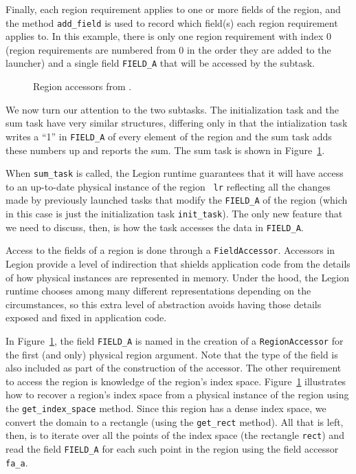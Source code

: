 Finally, each region requirement applies to one or more fields of the region, and the method {\tt add\_field} is
used to record which field(s) each region requirement applies to.
In this example, there is only one region requirement with index 0 (region requirements
are numbered from 0 in the order they are added to the launcher) and a single field {\tt FIELD\_A} that will be
accessed by the subtask.

\begin{figure}
  {\small
  }
\caption{Region accessors from .}
\label{fig:accessors}
\end{figure}
We now turn our attention to the two subtasks.  The initialization task and the sum task have very similar
structures, differing only in that the intialization task writes a ``1'' in {\tt FIELD\_A} of every element of the region and
the sum task adds these numbers up and reports the sum.  The sum task is shown in Figure~\ref{fig:accessors}.

When {\tt sum\_task} is called, the Legion runtime guarantees that it
will have access to an up-to-date physical instance of the region {\tt
  lr} reflecting all the changes made by previously launched tasks
that modify the {\tt FIELD\_A} of the region (which in this case is
just the initialization task {\tt init\_task}).  The only new feature
that we need to discuss, then, is how the task accesses the data in {\tt FIELD\_A}.

Access to the fields of a region is done through a {\tt FieldAccessor}.  Accessors in Legion provide a level of indirection
that shields application code from the details of how physical instances  are represented in memory.  Under the hood, 
the Legion runtime chooses among many different representations depending on the circumstances, so this extra level
of abstraction avoids having those details exposed and fixed in application code.

In Figure~\ref{fig:accessors}, the field
{\tt FIELD\_A} is named in the creation of a {\tt RegionAccessor} for the first (and only) physical region argument.
Note that the type of the field is also included as part of the construction of the accessor.
The other requirement to access the region is knowledge of the region's index space.  Figure~\ref{fig:accessors}
illustrates how to recover a region's index space from a physical instance of the region using the {\tt get\_index\_space} method.
Since this region has a dense index space, we convert the domain to a rectangle (using the {\tt get\_rect} method).
All that is left, then, is to iterate over all the points of the index space (the rectangle {\tt rect}) and read the
field {\tt FIELD\_A} for each such point in the region using the field accessor {\tt fa\_a}.

